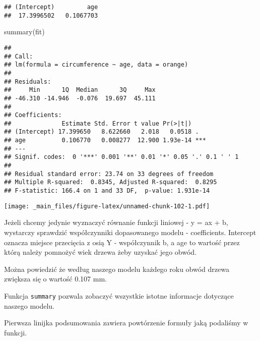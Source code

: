 \documentclass[
]{book}
\newenvironment{Shaded}{\begin{snugshade}}{\end{snugshade}}
\newcommand{\AttributeTok}[1]{\textcolor[rgb]{0.77,0.63,0.00}{#1}}
\newcommand{\FunctionTok}[1]{\textcolor[rgb]{0.00,0.00,0.00}{#1}}
\newcommand{\NormalTok}[1]{#1}
\newcommand{\SpecialCharTok}[1]{\textcolor[rgb]{0.00,0.00,0.00}{#1}}
\newcommand{\StringTok}[1]{\textcolor[rgb]{0.31,0.60,0.02}{#1}}
\begin{document}
\begin{verbatim}
## (Intercept)         age 
##  17.3996502   0.1067703
\end{verbatim}

\begin{Shaded}
\begin{Highlighting}[]
\FunctionTok{summary}\NormalTok{(fit)}
\end{Highlighting}
\end{Shaded}

\begin{verbatim}
## 
## Call:
## lm(formula = circumference ~ age, data = orange)
## 
## Residuals:
##     Min      1Q  Median      3Q     Max 
## -46.310 -14.946  -0.076  19.697  45.111 
## 
## Coefficients:
##              Estimate Std. Error t value Pr(>|t|)    
## (Intercept) 17.399650   8.622660   2.018   0.0518 .  
## age          0.106770   0.008277  12.900 1.93e-14 ***
## ---
## Signif. codes:  0 '***' 0.001 '**' 0.01 '*' 0.05 '.' 0.1 ' ' 1
## 
## Residual standard error: 23.74 on 33 degrees of freedom
## Multiple R-squared:  0.8345, Adjusted R-squared:  0.8295 
## F-statistic: 166.4 on 1 and 33 DF,  p-value: 1.931e-14
\end{verbatim}

\begin{Shaded}
\end{Shaded}

\texttt{[image: \_main\_files/figure-latex/unnamed-chunk-102-1.pdf]}

Jeżeli chcemy jedynie wyznaczyć równanie funkcji liniowej - y = ax + b, wystarczy sprawdzić współczynniki dopasowanego modelu - coefficients. Intercept oznacza miejsce przecięcia z osią Y - współczynnik b, a age to wartość przez którą należy pomnożyć wiek drzewa żeby uzyskać jego obwód.

Można powiedzić że według naszego modelu każdego roku obwód drzewa zwiększa się o wartość 0.107 mm.

Funkcja \texttt{summary} pozwala zobaczyć wszystkie istotne informacje dotyczące naszego modelu.

Pierwsza linijka podsumowania zawiera powtórzenie formuły jaką podaliśmy w funkcji.
\end{document}
